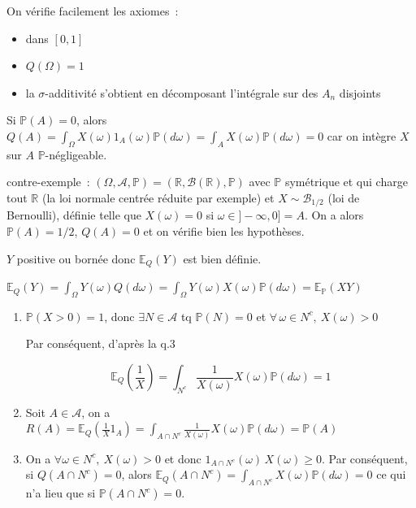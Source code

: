 \label{I-answer-mes-proba1}
On vérifie facilement les axiomes~:

\begin{itemize}
\tightlist
\item
  dans \([0,1]\)
\item
  \(Q(\Omega)= 1\)
\item
  la \(\sigma\)-additivité s'obtient en décomposant l'intégrale sur des
  \(A_n\) disjoints
\end{itemize}

\label{I-answer-mes-proba2}
Si \(\mathbb{P}(A)=0\), alors
\(Q(A) = \int_{\Omega} X(\omega) 1_A(\omega)\mathbb{P}(d\omega) = \int_{A} X(\omega)\mathbb{P}(d\omega) = 0\)
car on intègre \(X\) sur \(A\) \(\mathbb{P}\)-négligeable.

contre-exemple~:
\((\Omega,\mathcal{A},\mathbb{P}) = (\mathbb{R},\mathcal{B}(\mathbb{R}),\mathbb{P})\)
avec \(\mathbb{P}\) symétrique et qui charge tout \(\mathbb{R}\) (la loi
normale centrée réduite par exemple) et \(X \sim \mathcal{B}_{1/2}\)
(loi de Bernoulli), définie telle que \(X(\omega) = 0\) si
\(\omega \in ]-\infty,0] = A\). On a alors \(\mathbb{P}(A) = 1/2\),
\(Q(A) = 0\) et on vérifie bien les hypothèses.

\label{I-answer-mes-proba3}
\(Y\) positive ou bornée donc \(\mathbb{E}_Q(Y)\) est bien définie.

\(\mathbb{E}_Q(Y) = \int_{\Omega} Y(\omega) Q(d\omega) = \int_{\Omega} Y(\omega) X(\omega) \mathbb{P}(d\omega) = \mathbb{E}_\mathbb{P}(XY)\)

\label{I-answer-mes-proba4}

\begin{enumerate}
\def\labelenumi{\roman{enumi})}
\item
  \(\mathbb{P}(X > 0) = 1\), donc \(\exists N \in \mathcal{A}\) tq
  \(\mathbb{P}(N) = 0\) et \(\forall \, \omega \in N^c,~ X(\omega) > 0\)

  Par conséquent, d'après la q.3

  \[\mathbb{E}_Q\left(\frac{1}{X}\right) = \int_{N^c} \frac{1}{X(\omega)}X(\omega) \mathbb{P}(d\omega) = 1\]
\item
  Soit \(A \in \mathcal{A}\), on a
  \(R(A) = \mathbb{E}_Q(\frac{1}{X}1_A) = \int_{A \cap N^c} \frac{1}{X(\omega)}X(\omega) \mathbb{P}(d\omega) = \mathbb{P}(A)\)
\item
  On a \(\forall \omega \in N^c, ~ X(\omega) > 0\) et donc
  \(1_{A \cap N^c}(\omega)\,X(\omega) \geq 0\). Par conséquent, si
  \(Q(A\cap N^c) = 0\), alors
  \(\mathbb{E}_Q(A\cap N^c) = \int_{A \cap N^c} X(\omega) \mathbb{P}(d\omega) = 0\)
  ce qui n'a lieu que si \(\mathbb{P}(A\cap N^c) = 0\).
\end{enumerate}

